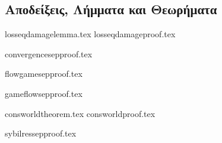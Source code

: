 \subsection{Αποδείξεις, Λήμματα και Θεωρήματα}
  {losseqdamagelemma.tex}
  {losseqdamageproof.tex}

  {convergencesepproof.tex}

  {flowgamesepproof.tex}

  {gameflowsepproof.tex}

  {consworldtheorem.tex}
  {consworldproof.tex}
 
  {sybilressepproof.tex}

